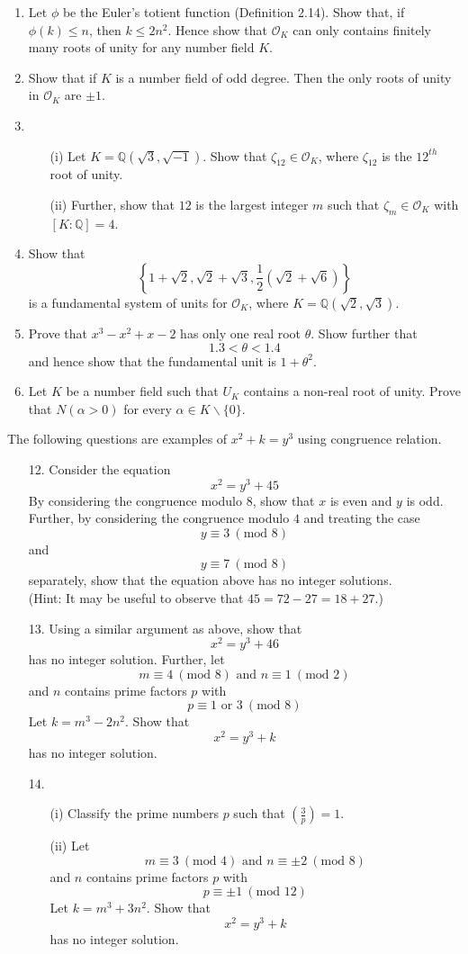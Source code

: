 \begin{enumerate}
\item Let $\phi$ be the Euler's totient function (Definition 2.14). Show that, if $\phi(k) \le n$, then
$k \le 2n^2$. Hence show that $\mathcal{O}_K$ can only contains finitely many roots of unity for any number field $K$.\\
\item Show that if $K$ is a number field of odd degree. Then the only roots of unity in
$\mathcal{O}_K$ are $\pm 1$.\\
\item
\begin{enumerate}
\item[(i)] Let $K=\mathbb{Q}(\sqrt{3},\sqrt{-1})$. Show that $\zeta_{12} \in \mathcal{O}_K$, where
$\zeta_{12}$ is the $12^{th}$ root of unity.
\item[(ii)] Further, show that $12$ is the largest integer $m$ such that $\zeta_m \in \mathcal{O}_K$ with
$[K:\mathbb{Q}]=4$.
\end{enumerate}
\item Show that
$$\left\{1+\sqrt{2},\sqrt{2}+\sqrt{3},\frac{1}{2}\left(\sqrt{2}+\sqrt{6}\right)\right\}$$
is a fundamental system of units for $\mathcal{O}_K$, where $K=\mathbb{Q}(\sqrt{2},\sqrt{3})$.
\item Prove that $x^3-x^2+x-2$ has only one real root $\theta$. Show further that
$$1.3<\theta<1.4$$
and hence show that the fundamental unit is $1+\theta^2$.
\item Let $K$ be a number field such that $U_K$ contains a non-real root of unity. Prove that
$N(\alpha >0)$ for every $\alpha \in K\backslash\{0\}$.
\end{enumerate}
The following questions are examples of
$x^2+k=y^3$
using congruence relation.
\begin{enumerate}
\item[12.] Consider the equation
$$x^2=y^3+45$$
By considering the congruence modulo $8$, show that $x$ is even and $y$ is odd. Further, by considering the congruence modulo $4$ and treating the case
$$y \equiv 3~(\text{mod } 8)$$
and
$$y \equiv 7~(\text{mod } 8)$$
separately, show that the equation above has no integer solutions.\\
(Hint: It may be useful to observe that $45=72-27=18+27$.)\\
\item[13.] Using a similar argument as above, show that
$$x^2=y^3+46$$ has no integer solution. Further, let
$$m \equiv 4~(\text{mod } 8) \text{ and } n \equiv 1~(\text{mod } 2)$$
and $n$ contains prime factors $p$ with
$$p \equiv 1 \text{ or } 3~(\text{mod } 8)$$
Let $k=m^3-2n^2$. Show that
$$x^2=y^3+k$$ has no integer solution.
\item[14.] \begin{enumerate}
\item[(i)] Classify the prime numbers $p$ such that $(\frac{3}{p})=1$.
\item[(ii)] Let
$$m \equiv 3~(\text{mod }4) \text{ and } n \equiv \pm 2~(\text{mod }8)$$
and $n$ contains prime factors $p$ with
$$p \equiv \pm 1~(\text{mod }12)$$
Let $k=m^3+3n^2$. Show that
$$x^2=y^3+k$$ has no integer solution.
\end{enumerate}
\end{enumerate}
